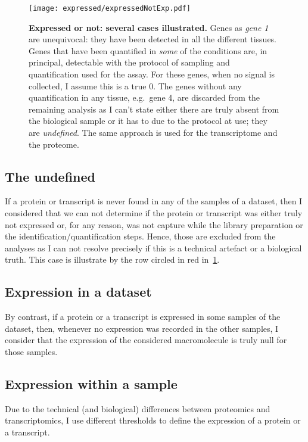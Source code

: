 \begin{figure}[!htbp]
    \texttt{[image: expressed/expressedNotExp.pdf]}\centering
      \caption[Expressed or not: several cases illustrated]
      {\label{fig:DefineExpression}\textbf{Expressed or not: several cases
      illustrated.}\smallbreak{} Genes as \emph{gene 1} are unequivocal: they have been
      detected in all the different tissues. Genes that have been quantified in
      \emph{some} of the conditions are, in principal, detectable with the
      protocol of sampling and quantification used for the assay.
      For these genes, when no signal is collected, I assume this is a true $0$.
      The genes without any quantification
      in any tissue, e.g.\ gene 4, are discarded from the remaining analysis as
      I can't state
      either there are truly absent from the biological sample or it has to due
      to the protocol at use; they are \emph{undefined}. The same approach is used
      for the transcriptome and the proteome.}
\end{figure}

\subsection{The undefined}%
\label{subsec:ExpressedOrNot-undefined}
If a protein or transcript is never found in any of the samples of a dataset,
then I considered that we can not determine if the protein or transcript was
either truly not expressed or, for any reason, was not capture while the library
preparation or the identification/quantification steps. Hence, those are
excluded from the analyses as I can not resolve precisely if this is a
technical artefact or a biological truth. This case is illustrate by the row
circled in red in~\cref{fig:DefineExpression}.

\subsection{Expression in a dataset}
\label{subsec:ExpressedOrNot--expDataset}
By contrast, if a protein or a transcript is expressed in some samples of the
dataset, then, whenever no expression was recorded in the other
samples, I consider that the expression of the considered macromolecule is truly
null for those samples.

\subsection{Expression within a sample}
Due to the technical (and biological) differences between proteomics and
transcriptomics, I use different thresholds to define the expression of a protein
or a transcript.

